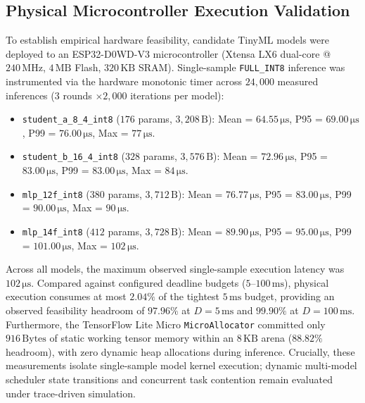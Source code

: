 \documentclass[journal]{IEEEtran}
\begin{document}
\subsection{Physical Microcontroller Execution Validation}
To establish empirical hardware feasibility, candidate TinyML models were deployed to an ESP32-D0WD-V3 microcontroller (Xtensa LX6 dual-core @ $240\,\text{MHz}$, $4\,\text{MB}$ Flash, $320\,\text{KB}$ SRAM). Single-sample \texttt{FULL\_INT8} inference was instrumented via the hardware monotonic timer  across $24,000$ measured inferences ($3$ rounds $\times 2,000$ iterations per model):
\begin{itemize}
    \item \texttt{student\_a\_8\_4\_int8} ($176$ params, $3,208\,\text{B}$): Mean = $64.55\,\si{\micro\second}$, P95 = $69.00\,\si{\micro\second}$, P99 = $76.00\,\si{\micro\second}$, Max = $77\,\si{\micro\second}$.
    \item \texttt{student\_b\_16\_4\_int8} ($328$ params, $3,576\,\text{B}$): Mean = $72.96\,\si{\micro\second}$, P95 = $83.00\,\si{\micro\second}$, P99 = $83.00\,\si{\micro\second}$, Max = $84\,\si{\micro\second}$.
    \item \texttt{mlp\_12f\_int8} ($380$ params, $3,712\,\text{B}$): Mean = $76.77\,\si{\micro\second}$, P95 = $83.00\,\si{\micro\second}$, P99 = $90.00\,\si{\micro\second}$, Max = $90\,\si{\micro\second}$.
    \item \texttt{mlp\_14f\_int8} ($412$ params, $3,728\,\text{B}$): Mean = $89.90\,\si{\micro\second}$, P95 = $95.00\,\si{\micro\second}$, P99 = $101.00\,\si{\micro\second}$, Max = $102\,\si{\micro\second}$.
\end{itemize}
Across all models, the maximum observed single-sample execution latency was $102\,\si{\micro\second}$. Compared against configured deadline budgets ($5$--$100\,\text{ms}$), physical execution consumes at most $2.04\%$ of the tightest $5\,\text{ms}$ budget, providing an observed feasibility headroom of $\mathbf{97.96\%}$ at $D=5\,\text{ms}$ and $\mathbf{99.90\%}$ at $D=100\,\text{ms}$. Furthermore, the TensorFlow Lite Micro \texttt{MicroAllocator} committed only $916\,\text{Bytes}$ of static working tensor memory within an $8\,\text{KB}$ arena ($88.82\%$ headroom), with zero dynamic heap allocations during inference. Crucially, these measurements isolate single-sample model kernel execution; dynamic multi-model scheduler state transitions and concurrent task contention remain evaluated under trace-driven simulation.
\end{document}
